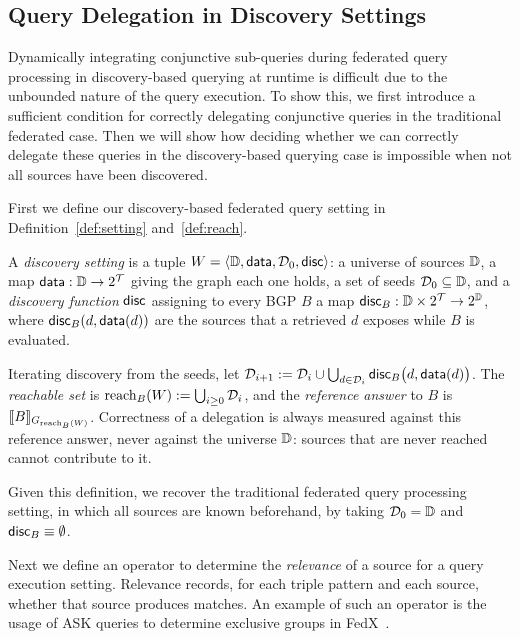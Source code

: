 \subsection{Query Delegation in Discovery Settings}
\label{sec:authority}
Dynamically integrating conjunctive sub-queries during federated query processing 
in discovery-based querying at runtime is difficult due to the unbounded nature of
the query execution. To show this, we first introduce a sufficient
condition for correctly delegating conjunctive queries in the traditional federated case.
Then we will show how deciding whether we can correctly delegate these queries in the
discovery-based querying case is impossible when not all sources have been discovered.
 
First we define our discovery-based federated query setting in 
Definition~\ref{def:setting} and~\ref{def:reach}.

\begin{definition}
\label{def:setting}
A \emph{discovery setting} is a tuple
$W = \langle \mathbb{D}, \mathsf{data}, \mathcal{D}_0, \mathsf{disc} \rangle$: a universe of sources $\mathbb{D}$, a map
$\mathsf{data} : \mathbb{D} \to 2^{\mathcal{T}}$ giving the graph each one holds, a set of seeds
$\mathcal{D}_0 \subseteq \mathbb{D}$, and a \emph{discovery function} $\mathsf{disc}$ assigning to every BGP $B$
a map $\mathsf{disc}_B : \mathbb{D} \times 2^{\mathcal{T}} \to 2^{\mathbb{D}}$, where $\mathsf{disc}_B(d, \mathsf{data}(d))$ are the
sources that a retrieved $d$ exposes while $B$ is evaluated.
\end{definition}

\begin{definition}
\label{def:reach}
Iterating discovery from the seeds, let
$\mathcal{D}_{i+1} := \mathcal{D}_i \cup \bigcup_{d \in \mathcal{D}_i} \mathsf{disc}_B\bigl(d, \mathsf{data}(d)\bigr)$. The
\emph{reachable set} is $\mathrm{reach}_B(W) := \bigcup_{i \geq 0} \mathcal{D}_i$, and the
\emph{reference answer} to $B$ is $\llbracket B \rrbracket_{G_{\mathrm{reach}_B(W)}}$. Correctness of a delegation
is always measured against this reference answer, never against the universe $\mathbb{D}$:
sources that are never reached cannot contribute to it.
\end{definition}

\noindent

Given this definition, we recover the traditional federated query processing setting,
in which all sources are known beforehand, by taking $\mathcal{D}_0 = \mathbb{D}$ 
and $\mathsf{disc}_B \equiv \emptyset$.

Next we define an operator to determine the \emph{relevance} of a source for a query
execution setting. Relevance records, for each triple pattern and each source, whether
that source produces matches. An example of such an operator is the usage of \textsf{ASK}
queries to determine exclusive groups in FedX~\cite{schwarte2011fedx}.

